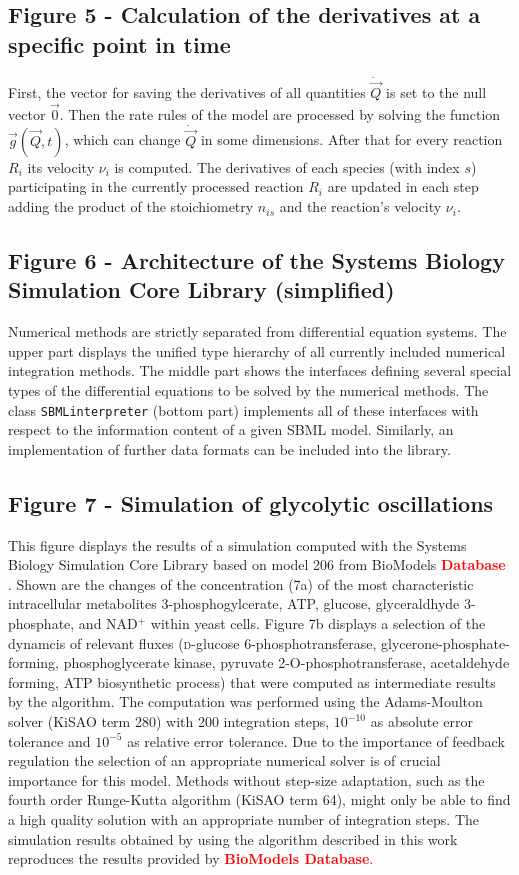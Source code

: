 \documentclass[10pt]{bmc_article}
\newenvironment{bmcformat}{\baselineskip20pt\sloppy\setboolean{publ}{false}}{\baselineskip20pt\sloppy}
\newcommand{\TODO}[1]{\textcolor{red}{\textbf{#1}}}
\newcommand{\SBMLinterpreter}{\texttt{SBML\-interpreter}}
\begin{document}
\begin{bmcformat}
\subsection*{Figure 5 - Calculation of the derivatives at a specific point in time}
First, the vector for saving the derivatives of all quantities $\dot{\vec{Q}}$ is set to the null vector $\vec{0}$.
Then the rate rules of the model are processed by solving the function $\vec{g}(\vec{Q}, t)$, which can change $\dot{\vec{Q}}$ in some dimensions.
After that for every reaction $R_i$ its velocity $\nu_i$ is computed.
The derivatives of each species (with index $s$) participating in the currently processed reaction $R_i$ are updated
in each step adding the product of the stoichiometry $n_{is}$ and the reaction's velocity $\nu_i$.

\subsection*{Figure 6 - Architecture of the Systems Biology Simulation Core Library (simplified)}
Numerical methods are strictly separated from differential equation systems. The
upper part displays the unified type hierarchy of all currently included numerical integration
methods. The middle part shows the interfaces defining several
special types of the differential equations to be solved by the numerical
methods.
The class \SBMLinterpreter{} (bottom part) implements all of these interfaces
with respect to the information content of a given SBML model. Similarly, an
implementation of further data formats can be included into the
library.

\subsection*{Figure 7 - Simulation of glycolytic oscillations}
This figure displays the results of a simulation computed with the Systems
Biology Simulation Core Library based on model 206 from BioModels \TODO{Database}
\cite{Novere2006a, Wolf2000}.
Shown are the changes of the concentration (7a) of the most characteristic
intracellular metabolites 3-phosphogylcerate, ATP, glucose, glyceraldhyde 
3-phosphate, and NAD$^+$ within yeast cells.
Figure 7b displays a selection of the dynamcis of relevant fluxes 
(\textsc{d}-glucose 6-phosphotransferase, glycerone-phosphate-forming,
phosphoglycerate kinase, pyruvate 2-O-phosphotransferase, acetaldehyde forming,
ATP biosynthetic process)
that were computed as intermediate results by the algorithm.
The computation was performed using the Adams-Moulton solver \cite{Hairer2000}
(KiSAO term 280) with 200 integration steps, $10^{-10}$ as absolute error
tolerance and $10^{-5}$ as relative error tolerance.
Due to the importance of feedback regulation the selection of an appropriate
numerical solver is of crucial importance for this model.
Methods without step-size adaptation, such as the fourth order Runge-Kutta
algorithm (KiSAO term 64), might only be able to find a high quality solution 
with an appropriate number of integration steps. 
The simulation results obtained by using the algorithm described in this work
reproduces the results provided by \TODO{BioModels Database}. 


\end{bmcformat}
\end{document}
